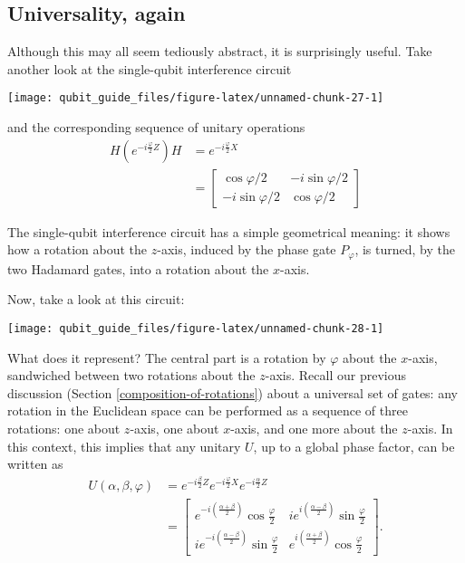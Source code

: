 \documentclass[fleqn]{article}
\newenvironment{idea}{\noindent}{\medskip}
\begin{document}
\hypertarget{universality-again}{%
\subsection{Universality, again}\label{universality-again}}

Although this may all seem tediously abstract, it is surprisingly useful.
Take another look at the single-qubit interference circuit

\begin{center}\texttt{[image: qubit\_guide\_files/figure-latex/unnamed-chunk-27-1]} \end{center}

and the corresponding sequence of unitary operations
\[
  \begin{aligned}
    H \left(
      e^{-i\frac{\varphi}{2}Z}
    \right) H
    &= e^{-i\frac{\varphi}{2}X}
  \\&= \begin{bmatrix}
      \cos\varphi/2 & -i\sin\varphi/2
    \\-i\sin\varphi/2 & \cos\varphi/2
    \end{bmatrix}
  \end{aligned}
\]

\begin{idea}
The single-qubit interference circuit has a simple geometrical meaning: it shows how a rotation about the \(z\)-axis, induced by the phase gate \(P_\varphi\), is turned, by the two Hadamard gates, into a rotation about the \(x\)-axis.

\end{idea}

Now, take a look at this circuit:

\begin{center}\texttt{[image: qubit\_guide\_files/figure-latex/unnamed-chunk-28-1]} \end{center}

What does it represent?
The central part is a rotation by \(\varphi\) about the \(x\)-axis, sandwiched between two rotations about the \(z\)-axis.
Recall our previous discussion (Section \ref{composition-of-rotations}) about a universal set of gates: any rotation in the Euclidean space can be performed as a sequence of three rotations: one about \(z\)-axis, one about \(x\)-axis, and one more about the \(z\)-axis.
In this context, this implies that any unitary \(U\), up to a global phase factor, can be written as
\[
  \begin{aligned}
    U(\alpha, \beta, \varphi)
    &= e^{-i\frac{\beta}{2}Z} e^{-i\frac{\varphi}{2}X} e^{-i\frac{\alpha}{2}Z}
  \\&= \begin{bmatrix}
      e^{-i\left(\frac{\alpha+\beta}{2}\right)}\cos\frac{\varphi}{2}
      & ie^{i\left(\frac{\alpha-\beta}{2}\right)}\sin\frac\varphi{2}
    \\ie^{-i\left(\frac{\alpha-\beta}{2}\right)}\sin\frac\varphi{2}
      & e^{i\left(\frac{\alpha+\beta}{2}\right)}\cos\frac\varphi{2}
    \end{bmatrix}.
  \end{aligned}
\]
\end{document}
